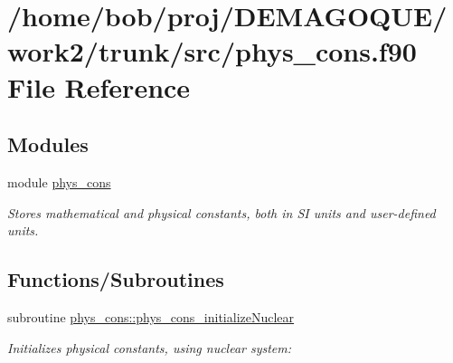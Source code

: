\hypertarget{phys__cons_8f90}{
\section{/home/bob/proj/DEMAGOQUE/work2/trunk/src/phys\_\-cons.f90 File Reference}
\label{phys__cons_8f90}
}
\subsection*{Modules}
\begin{DoxyCompactItemize}
\item 
module \hyperlink{namespacephys__cons}{phys\_\-cons}


\begin{DoxyCompactList}\small\item\em Stores mathematical and physical constants, both in SI units and user-\/defined units. \item\end{DoxyCompactList}

\end{DoxyCompactItemize}
\subsection*{Functions/Subroutines}
\begin{DoxyCompactItemize}
\item 
subroutine \hyperlink{namespacephys__cons_ab13f84d8b6f574eb73870a2964a82b8b}{phys\_\-cons::phys\_\-cons\_\-initializeNuclear}
\begin{DoxyCompactList}\small\item\em Initializes physical constants, using nuclear system: \item\end{DoxyCompactList}\end{DoxyCompactItemize}
